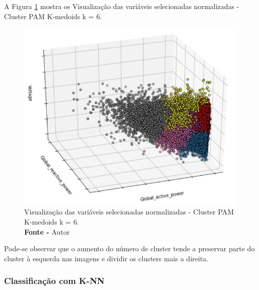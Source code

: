 A Figura \ref{fig: Visualização das variáveis selecionadas normalizadas - Cluster PAM K-medoids k = 6} mostra os Visualização das variáveis selecionadas normalizadas - Cluster PAM K-medoids k = 6.
\begin{figure}[H]
    \centering
    \includegraphics[width=0.99\textwidth]{Figuras/4. Resultados e Discussões/Exer4/Visualização das variáveis selecionadas normalizadas - Cluster PAM K-medoids k = 6.jpg}
    \caption{Visualização das variáveis selecionadas normalizadas - Cluster PAM K-medoids k = 6.\\ \textbf{Fonte -} Autor}
    \label{fig: Visualização das variáveis selecionadas normalizadas - Cluster PAM K-medoids k = 6}
\end{figure}


Pode-se observar que o aumento do número de cluster tende a preservar parte do cluster à esquerda nas imagens e dividir os clusters mais a direita.

\subsubsection{Classificação com K-NN}

